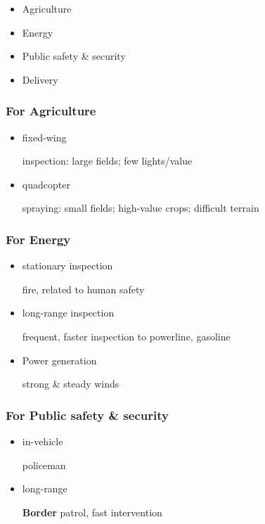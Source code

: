 \documentclass[]{article}
\begin{document}
\begin{itemize}
\item
  Agriculture
\item
  Energy
\item
  Public safety \& security
\item
  Delivery
\end{itemize}

\subsubsection{For Agriculture}\label{header-n61}

\begin{itemize}
\item
  fixed-wing

  inspection: large fields; few lights/value
\item
  quadcopter

  spraying: small fields; high-value crops; difficult terrain
\end{itemize}

\subsubsection{For Energy}\label{header-n69}

\begin{itemize}
\item
  stationary inspection

  fire, related to human safety
\item
  long-range inspection

  frequent, faster inspection to powerline, gasoline
\item
  Power generation

  strong \& steady winds
\end{itemize}

\subsubsection{For Public safety \& security}\label{header-n80}

\begin{itemize}
\item
  in-vehicle

  policeman
\item
  long-range

  \textbf{Border} patrol, fast intervention
\end{itemize}
\end{document}
